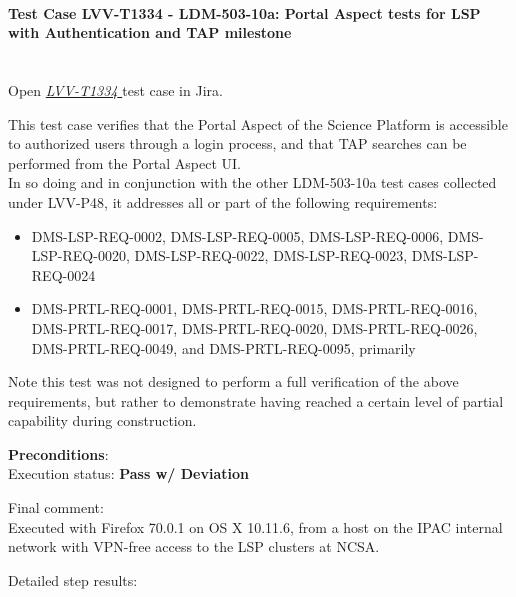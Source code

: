 \documentclass[DM,lsstdraft,STR,toc]{lsstdoc}
\providecommand{\tightlist}{
  \setlength{\itemsep}{0pt}\setlength{\parskip}{0pt}}
\begin{document}
    \paragraph{Test Case LVV-T1334 - LDM-503-10a: Portal Aspect tests for LSP with Authentication and TAP
milestone
 }\mbox{}\\

Open  \href{https://jira.lsstcorp.org/secure/Tests.jspa#/testCase/LVV-T1334}{\textit{ LVV-T1334 } }
test case in Jira.

    This test case verifies that the Portal Aspect of the Science Platform
is accessible to authorized users through a login process, and that TAP
searches can be performed from the Portal Aspect UI.\\[2\baselineskip]In
so doing and in conjunction with the other LDM-503-10a test cases
collected under LVV-P48, it addresses all or part of the following
requirements:

\begin{itemize}
\tightlist
\item
  DMS-LSP-REQ-0002, DMS-LSP-REQ-0005, DMS-LSP-REQ-0006,
  DMS-LSP-REQ-0020, DMS-LSP-REQ-0022, DMS-LSP-REQ-0023, DMS-LSP-REQ-0024
\item
  DMS-PRTL-REQ-0001, DMS-PRTL-REQ-0015, DMS-PRTL-REQ-0016,
  DMS-PRTL-REQ-0017, DMS-PRTL-REQ-0020, DMS-PRTL-REQ-0026,
  DMS-PRTL-REQ-0049, and DMS-PRTL-REQ-0095, primarily
\end{itemize}

Note this test was not designed to perform a full verification of the
above requirements, but rather to demonstrate having reached a certain
level of partial capability during construction.


    \textbf{ Preconditions}:\\
    

    Execution status: {\bf Pass w/ Deviation }

    Final comment:\\Executed with Firefox 70.0.1 on OS X 10.11.6, from a host on the IPAC
internal network with VPN-free access to the LSP clusters at NCSA.



    Detailed step results:
\end{document}
